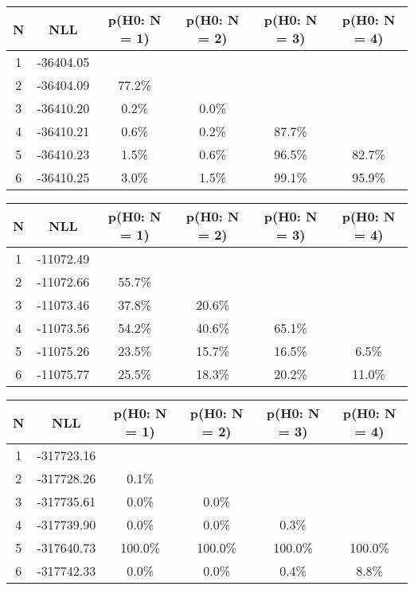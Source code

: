 \begin{table}[htb]
	\begin{center}
{\footnotesize\renewcommand{\arraystretch}{1.4}
		\begin{tabular}{cc||cccc}
			N & NLL & p(H0: N = 1) & p(H0: N = 2) & p(H0: N = 3) & p(H0: N = 4)\\ 
		\hline
1 & -36404.05 & & & & \\
2 & -36404.09 & 77.2\% & & & \\
3 & -36410.20 & 0.2\% & 0.0\% & & \\
4 & -36410.21 & 0.6\% & 0.2\% & 87.7\% & \\
5 & -36410.23 & 1.5\% & 0.6\% & 96.5\% & 82.7\% \\
6 & -36410.25 & 3.0\% & 1.5\% & 99.1\% & 95.9\% \\
	\end{tabular}
		\label{tab:lab}
	}
	\end{center}\end{table}

\begin{table}[htb]
	\begin{center}
{\footnotesize\renewcommand{\arraystretch}{1.4}
		\begin{tabular}{cc||cccc}
			N & NLL & p(H0: N = 1) & p(H0: N = 2) & p(H0: N = 3) & p(H0: N = 4)\\ 
		\hline
1 & -11072.49 & & & & \\
2 & -11072.66 & 55.7\% & & & \\
3 & -11073.46 & 37.8\% & 20.6\% & & \\
4 & -11073.56 & 54.2\% & 40.6\% & 65.1\% & \\
5 & -11075.26 & 23.5\% & 15.7\% & 16.5\% & 6.5\% \\
6 & -11075.77 & 25.5\% & 18.3\% & 20.2\% & 11.0\% \\
	\end{tabular}
		\label{tab:lab}
	}
	\end{center}\end{table}

\begin{table}[htb]
	\begin{center}
{\footnotesize\renewcommand{\arraystretch}{1.4}
		\begin{tabular}{cc||cccc}
			N & NLL & p(H0: N = 1) & p(H0: N = 2) & p(H0: N = 3) & p(H0: N = 4)\\ 
		\hline
1 & -317723.16 & & & & \\
2 & -317728.26 & 0.1\% & & & \\
3 & -317735.61 & 0.0\% & 0.0\% & & \\
4 & -317739.90 & 0.0\% & 0.0\% & 0.3\% & \\
5 & -317640.73 & 100.0\% & 100.0\% & 100.0\% & 100.0\% \\
6 & -317742.33 & 0.0\% & 0.0\% & 0.4\% & 8.8\% \\
	\end{tabular}
		\label{tab:lab}
	}
	\end{center}\end{table}

